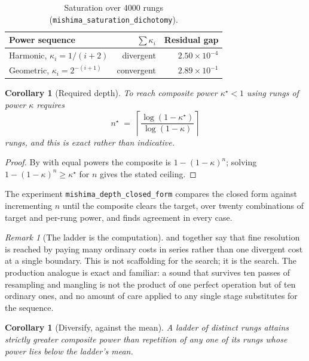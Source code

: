 \documentclass[11pt,twocolumn,a4paper]{article}
\newtheorem{corollary}[theorem]{Corollary}
\theoremstyle{definition}
\theoremstyle{remark}
\newtheorem{remark}[theorem]{Remark}
\newcommand{\pot}{\kappa}
\begin{document}
\begin{table}[H]
\centering
\small
\caption{Saturation over $4000$ rungs
(\texttt{mishima\_saturation\_dichotomy}).}
\label{tab:saturation}
\begin{tabular}{@{}lrr@{}}
\toprule
Power sequence & $\sum\pot_i$ & Residual gap \\
\midrule
Harmonic, $\pot_i = 1/(i{+}2)$   & divergent  & $2.50\times10^{-4}$ \\
Geometric, $\pot_i = 2^{-(i+1)}$ & convergent & $2.89\times10^{-1}$ \\
\bottomrule
\end{tabular}
\end{table}

\begin{corollary}[Required depth]
\label{cor:depth}
To reach composite power $\pot^{\star}<1$ using rungs of power $\pot$ requires
\[
  n^{\star} \;=\;
  \left\lceil \frac{\log(1-\pot^{\star})}{\log(1-\pot)} \right\rceil
\]
rungs, and this is exact rather than indicative.
\end{corollary}

\begin{proof}
By  with equal powers the composite is $1-(1-\pot)^n$;
solving $1-(1-\pot)^n\ge\pot^{\star}$ for $n$ gives the stated ceiling.
\end{proof}

The experiment \texttt{mishima\_depth\_closed\_form} compares the closed form
against incrementing $n$ until the composite clears the target, over twenty
combinations of target and per-rung power, and finds agreement in every case.

\begin{remark}[The ladder is the computation]
\label{rem:ladder-is}
 and  together say that fine resolution
is reached by paying many ordinary costs in series rather than one divergent cost
at a single boundary. This is not scaffolding for the search; it is the search.
The production analogue is exact and familiar: a sound that survives ten passes
of resampling and mangling is not the product of one perfect operation but of ten
ordinary ones, and no amount of care applied to any single stage substitutes for
the sequence.
\end{remark}

\begin{corollary}[Diversify, against the mean]
\label{cor:diversify}
A ladder of distinct rungs attains strictly greater composite power than
repetition of any one of its rungs whose power lies below the ladder's mean.
\end{corollary}
\end{document}
